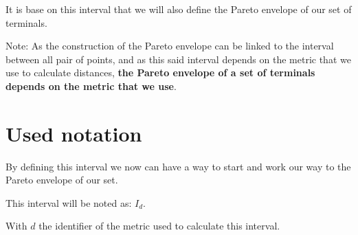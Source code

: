 It is base on this interval that we will also define the Pareto envelope of our set of terminals.

Note: As the construction of the Pareto envelope can be linked to the interval between all pair of points, and as this said interval depends on the metric that we use to calculate distances, \textbf{the Pareto envelope of a set of terminals depends on the metric that we use}.

\section{Used notation}
By defining this interval we now can have a way to start and work our way to the Pareto envelope of our set. 

This interval will be noted as: $I_{d}$.

\noindent With $d$ the identifier of the metric used to calculate this interval.